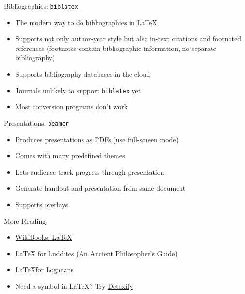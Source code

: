 \begin{frame}{Bibliographies: \texttt{biblatex}}

\begin{itemize}
\item The modern way to do bibliographies in \LaTeX
\item Supports not only author-year style but also in-text citations
  and footnoted references (footnotes contain bibliographic
  information, no separate bibliography)
\item Supports bibliography databases in the cloud
\item Journals unlikely to support \texttt{biblatex} yet
\item Most conversion programs don't work 
\end{itemize}

\end{frame}

\begin{frame}{Presentations: \texttt{beamer}}

\begin{itemize}[<+->]
\item Produces presentations as PDFs (use full-screen mode)
\item Comes with many predefined themes
\item Lets audience track progress through presentation
\item Generate handout and presentation from same document
\item Supports overlays
\end{itemize}

\end{frame}



\begin{frame}{More Reading}

\begin{itemize}
\item \href{http://en.wikibooks.org/wiki/LaTeX}{WikiBooks: \LaTeX}
\item \href{http://individual.utoronto.ca/williecostello/latex.html}{\LaTeX{} for Luddites (An Ancient Philosopher's Guide)}
\item \href{http://www.logicmatters.net/latex-for-logicians/}{\LaTeX{}for Logicians}
\item Need a symbol in \LaTeX? Try
  \href{http://detexify.kirelabs.org/classify.html}{Detexify}
\end{itemize}

\end{frame}


